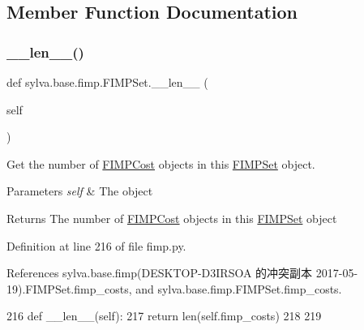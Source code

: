 \subsection{Member Function Documentation}
\mbox{\label{classsylva_1_1base_1_1fimp_1_1_f_i_m_p_set_a4926765210c72bc0b888b7721e6d522a}} 
\subsubsection{\texorpdfstring{\+\_\+\+\_\+len\+\_\+\+\_\+()}{\_\_len\_\_()}}
{\footnotesize\ttfamily def sylva.\+base.\+fimp.\+F\+I\+M\+P\+Set.\+\_\+\+\_\+len\+\_\+\+\_\+ (\begin{DoxyParamCaption}\item[{}]{self }\end{DoxyParamCaption})}



Get the number of \hyperlink{classsylva_1_1base_1_1fimp_1_1_f_i_m_p_cost}{F\+I\+M\+P\+Cost} objects in this \hyperlink{classsylva_1_1base_1_1fimp_1_1_f_i_m_p_set}{F\+I\+M\+P\+Set} object. 


\begin{DoxyParams}{Parameters}
{\em self} & The object\\
\hline
\end{DoxyParams}
\begin{DoxyReturn}{Returns}
The number of \hyperlink{classsylva_1_1base_1_1fimp_1_1_f_i_m_p_cost}{F\+I\+M\+P\+Cost} objects in this \hyperlink{classsylva_1_1base_1_1fimp_1_1_f_i_m_p_set}{F\+I\+M\+P\+Set} object 
\end{DoxyReturn}


Definition at line 216 of file fimp.\+py.



References sylva.\+base.\+fimp(\+D\+E\+S\+K\+T\+O\+P-\/\+D3\+I\+R\+S\+O\+A 的冲突副本 2017-\/05-\/19).\+F\+I\+M\+P\+Set.\+fimp\+\_\+costs, and sylva.\+base.\+fimp.\+F\+I\+M\+P\+Set.\+fimp\+\_\+costs.


\begin{DoxyCode}
216     \textcolor{keyword}{def }\_\_len\_\_(self):
217         \textcolor{keywordflow}{return} len(self.fimp\_costs)
218 
219 
\end{DoxyCode}
\mbox{\label{classsylva_1_1base_1_1fimp_1_1_f_i_m_p_set_afcd977effdc02e0d1818add10ab11846}} 
